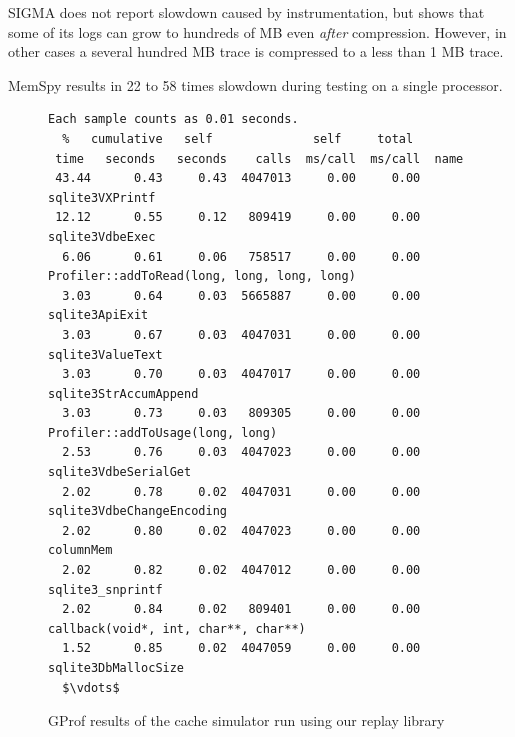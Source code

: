 SIGMA does not report slowdown caused by instrumentation, but shows
that some of its logs can grow to hundreds of MB even \emph{after} compression.
However, in other cases a several hundred MB trace is compressed
to a less than 1 MB trace.

MemSpy results in 22 to 58 times slowdown during testing on a single processor.

\begin{figure}
  \lstset{basicstyle=\footnotesize, mathescape=true}
  \begin{lstlisting}
Each sample counts as 0.01 seconds.
  %   cumulative   self              self     total           
 time   seconds   seconds    calls  ms/call  ms/call  name    
 43.44      0.43     0.43  4047013     0.00     0.00  sqlite3VXPrintf
 12.12      0.55     0.12   809419     0.00     0.00  sqlite3VdbeExec
  6.06      0.61     0.06   758517     0.00     0.00  Profiler::addToRead(long, long, long, long)
  3.03      0.64     0.03  5665887     0.00     0.00  sqlite3ApiExit
  3.03      0.67     0.03  4047031     0.00     0.00  sqlite3ValueText
  3.03      0.70     0.03  4047017     0.00     0.00  sqlite3StrAccumAppend
  3.03      0.73     0.03   809305     0.00     0.00  Profiler::addToUsage(long, long)
  2.53      0.76     0.03  4047023     0.00     0.00  sqlite3VdbeSerialGet
  2.02      0.78     0.02  4047031     0.00     0.00  sqlite3VdbeChangeEncoding
  2.02      0.80     0.02  4047023     0.00     0.00  columnMem
  2.02      0.82     0.02  4047012     0.00     0.00  sqlite3_snprintf
  2.02      0.84     0.02   809401     0.00     0.00  callback(void*, int, char**, char**)
  1.52      0.85     0.02  4047059     0.00     0.00  sqlite3DbMallocSize
  $\vdots$
  \end{lstlisting}
  \caption{GProf results of the cache simulator run using our replay library}
  \label{fig:profiler}
\end{figure}
